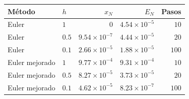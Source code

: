 \begin{tabular}{llrrr}
\toprule
Método & $h$ & $x_N$ & $E_N$ & Pasos \\
\midrule
Euler & $1$ & $0$ & $4.54 \times 10^{-5}$ & $10$ \\
Euler & $0.5$ & $9.54 \times 10^{-7}$ & $4.44 \times 10^{-5}$ & $20$ \\
Euler & $0.1$ & $2.66 \times 10^{-5}$ & $1.88 \times 10^{-5}$ & $100$ \\
Euler mejorado & $1$ & $9.77 \times 10^{-4}$ & $9.31 \times 10^{-4}$ & $10$ \\
Euler mejorado & $0.5$ & $8.27 \times 10^{-5}$ & $3.73 \times 10^{-5}$ & $20$ \\
Euler mejorado & $0.1$ & $4.62 \times 10^{-5}$ & $8.23 \times 10^{-7}$ & $100$ \\
\bottomrule
\end{tabular}
